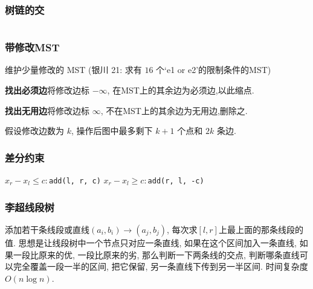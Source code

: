 \subsubsection{树链的交}
	\inputminted{cpp}{src/yzh/path_inter.cpp}

\subsubsection{带修改MST}
    维护少量修改的 MST (银川 21: 求有 $16$ 个`e1 or e2'的限制条件的MST) 
    \par \textbf{找出必须边}将修改边标 $-\infty$, 在MST上的其余边为必须边,以此缩点.
    \par \textbf{找出无用边}将修改边标 $\infty$, 不在MST上的其余边为无用边,删除之. 
    \par 假设修改边数为 $k$, 操作后图中最多剩下 $k+1$ 个点和 $2k$ 条边.
    

\subsubsection{差分约束}
$x_r - x_l \leq c:$\texttt{add(l, r, c)}
$x_r - x_l \geq c:$\texttt{add(r, l, -c)}
\subsubsection{李超线段树}
        添加若干条线段或直线$(a_i,b_i)\to (a_j,b_j)$, 每次求$[l,r]$上最上面的那条线段的值. 思想是让线段树中一个节点只对应一条直线, 如果在这个区间加入一条直线, 如果一段比原来的优, 一段比原来的劣, 那么判断一下两条线的交点, 判断哪条直线可以完全覆盖一段一半的区间, 把它保留, 另一条直线下传到另一半区间. 时间复杂度$O(n \log n)$. 

